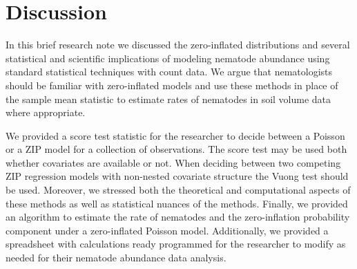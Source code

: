 \documentclass{article}
\begin{document}
\section{Discussion}\label{sec:disc}
In this brief research note we discussed the zero-inflated distributions and several statistical and scientific implications of modeling nematode abundance using standard statistical techniques with count data. We argue that nematologists should be familiar with zero-inflated models and use these methods in place of the sample mean statistic to estimate rates of nematodes in soil volume data where appropriate. 

We provided a score test statistic for the researcher to decide between a Poisson or a ZIP model for a collection of observations. The score test may be used both whether covariates are available or not. When deciding between two competing ZIP regression models with non-nested covariate structure the Vuong test should be used. Moreover, we stressed both the theoretical and computational aspects of these methods as well as statistical nuances of the methods. Finally, we provided an algorithm to estimate the rate of nematodes and the zero-inflation probability component under a zero-inflated Poisson model. Additionally, we provided a spreadsheet with calculations ready programmed for the researcher to modify as needed for their nematode abundance data analysis.

 
\end{document}
